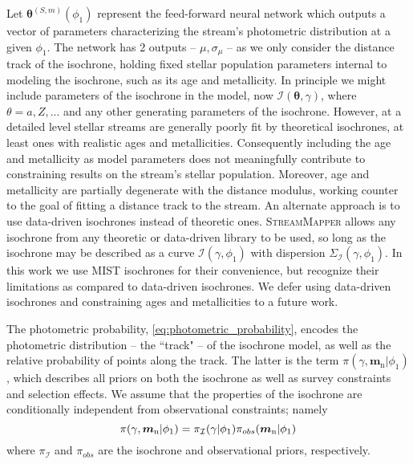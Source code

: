 \documentclass[twocolumn, linenumbers]{aastex631}
\newcommand{\code}[1]{\textsc{#1}}
\newcommand{\package}[1]{\code{#1}}
\newcommand{\mrm}[1]{\mathrm{#1}}
\newcommand{\mbs}[1]{\boldsymbol{#1}}
\newcommand{\mcal}[1]{\mathcal{#1}}
\newcommand{\prior}{\mcal{\pi}}
\newcommand{\nth}[1]{{#1}_{\mrm{n}}}  %
\newcommand{\smallcomponent}[2]{#2^{\scriptscriptstyle (#1)}}
\newcommand{\cmp}[2]{\smallcomponent{#1}{#2}}
\begin{document}
            Let $\cmp{S,m}{\mbs{\theta}}(\phi_1)$ represent the feed-forward
            neural network which outputs a vector of parameters characterizing
            the stream's photometric distribution at a given $\phi_1$. The
            network has 2 outputs -- $\mu, \sigma_\mu$ -- as we only consider
            the distance track of the isochrone, holding fixed stellar
            population parameters internal to modeling the isochrone, such as
            its age and metallicity.  In principle we might include parameters
            of the isochrone in the model, now $\mcal{I}(\mbs{\theta}, \gamma)$,
            where $\theta = {a, Z, ...}$ and any other generating parameters of
            the isochrone.  However, at a detailed level stellar streams are
            generally poorly fit by theoretical isochrones, at least ones with
            realistic ages and metallicities.  Consequently including the age
            and metallicity as model parameters does not meaningfully contribute
            to constraining results on the stream's stellar population.
            Moreover, age and metallicity are partially degenerate with the
            distance modulus, working counter to the goal of fitting a distance
            track to the stream. An alternate approach is to use data-driven
            isochrones instead of theoretic ones.   \package{StreamMapper}
            allows any isochrone from any theoretic or data-driven library to be
            used, so long as the isochrone may be described as a curve
            $\mcal{I}(\gamma, \phi_1)$ with dispersion
            $\Sigma_{\mcal{I}}(\gamma, \phi_1)$. In this work we use MIST
            \citep{Dotter2016, Choi+2016} isochrones for their convenience, but
            recognize their limitations as compared to data-driven isochrones.
            We defer using data-driven isochrones and constraining ages and
            metallicities to a future work.

            The photometric probability, \autoref{eq:photometric_probability},
            encodes the photometric distribution -- the ``track" -- of the
            isochrone model, as well as the relative probability of points along
            the track. The latter is the term $\prior(\gamma, \nth{\mbs{m}} |
            \phi_1)$, which describes all priors on both the isochrone as well
            as survey constraints and selection effects. We assume that the
            properties of the isochrone are conditionally independent from
            observational constraints; namely
            \begin{equation} \label{eq:isochrone_prior_components}
                \prior(\gamma, \nth{\mbs{m}} | \phi_1) = \prior_{\cal{I}}(\gamma | \phi_1) \prior_{obs}(\nth{\mbs{m}} | \phi_1)
            \end{equation}
            where $\prior_{\mcal{I}}$ and $\prior_{obs}$ are the isochrone and
            observational priors, respectively.
            
\end{document}
